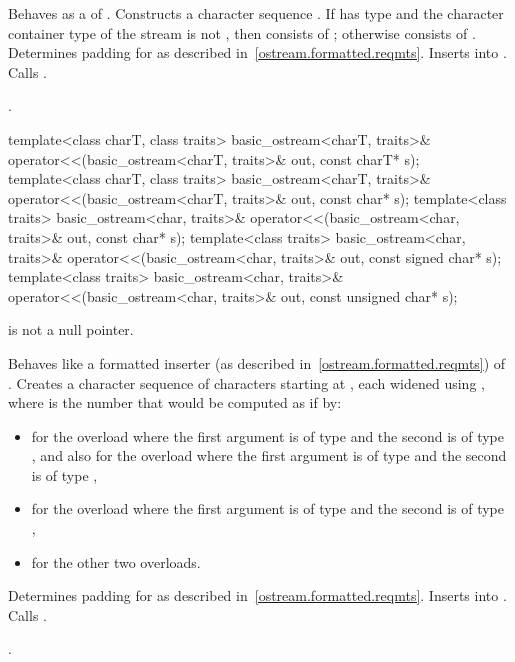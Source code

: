 \begin{itemdescr}
\pnum
\effects
Behaves as a 
of . Constructs a character sequence .
If  has type
and the character container type of the stream is not
,
then  consists of
;
otherwise  consists of
. Determines padding for  as described
in~\ref{ostream.formatted.reqmts}. Inserts  into
. Calls .

\pnum
\returns
{}.
\end{itemdescr}

%
\begin{itemdecl}
template<class charT, class traits>
  basic_ostream<charT, traits>& operator<<(basic_ostream<charT, traits>& out, const charT* s);
template<class charT, class traits>
  basic_ostream<charT, traits>& operator<<(basic_ostream<charT, traits>& out, const char* s);
template<class traits>
  basic_ostream<char, traits>& operator<<(basic_ostream<char, traits>& out, const char* s);
template<class traits>
  basic_ostream<char, traits>& operator<<(basic_ostream<char, traits>& out, const signed char* s);
template<class traits>
  basic_ostream<char, traits>& operator<<(basic_ostream<char, traits>& out,
                                          const unsigned char* s);
\end{itemdecl}

\begin{itemdescr}
\pnum
\expects
{} is not a null pointer.

\pnum
\effects
Behaves like a formatted inserter (as described in~\ref{ostream.formatted.reqmts}) of .
Creates a character sequence  of  characters
starting at , each widened using
,
where  is the number that would be computed as if by:
\begin{itemize}
\item
{}
for the overload where the first argument is of type
and the second is of type
,
and also for the overload where the first argument is of type
and the second is of type
,
\item
{}
for the overload where the first argument is of type
and the second is of type
,
\item
{}
for the other two overloads.
\end{itemize}
Determines padding for  as described
in~\ref{ostream.formatted.reqmts}. Inserts  into
. Calls .

\pnum
\returns
{}.
\end{itemdescr}

